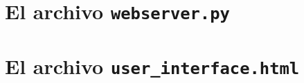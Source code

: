 \documentclass[letterpaper,10.5pt]{article}
\begin{document}
\cleardoublepage
\appendix
\section{El archivo \texttt{webserver.py}}%
\label{sec:webserver-py}
\setlength{\columnsep}{1cm}
\begin{multicols}{2}

\end{multicols}

\section{El archivo \texttt{user\_interface.html}}%
\label{sec:ui-html}
\setlength{\columnsep}{1cm}
\begin{multicols}{2}

\end{multicols}
\end{document}
